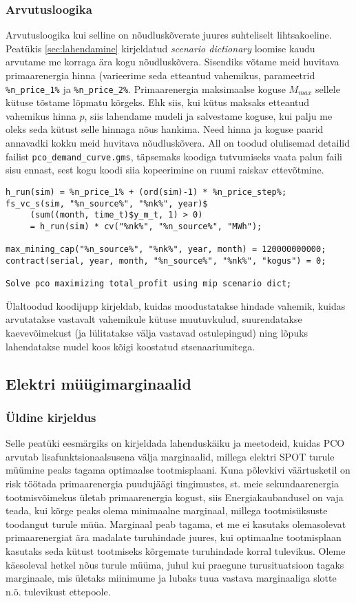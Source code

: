 \documentclass[10pt,a4paper]{article}
\begin{document}
\subsubsection{Arvutusloogika}
Arvutusloogika kui selline on nõudluskõverate juures suhteliselt lihtsakoeline. Peatükis \ref{sec:lahendamine} kirjeldatud \emph{scenario dictionary} loomise kaudu arvutame me korraga ära kogu nõudluskõvera. Sisendiks võtame meid huvitava primaarenergia hinna (varieerime seda etteantud vahemikus, parameetrid \texttt{\%n\_price\_1\%} ja \texttt{\%n\_price\_2\%}. Primaarenergia maksimaalse koguse $\mathit{M}_{max}$ sellele kütuse tõstame lõpmatu kõrgeks. Ehk siis, kui kütus maksaks etteantud vahemikus hinna $p$, siis lahendame mudeli ja salvestame koguse, kui palju me oleks seda kütust selle hinnaga nõus hankima. Need hinna ja koguse paarid annavadki kokku meid huvitava nõudluskõvera. All on toodud olulisemad detailid failist \texttt{pco\_demand\_curve.gms}, täpsemaks koodiga tutvumiseks vaata palun faili sisu ennast, sest kogu koodi siia kopeerimine on ruumi raiskav ettevõtmine. 
\begin{verbatim}
h_run(sim) = %n_price_1% + (ord(sim)-1) * %n_price_step%;  
fs_vc_s(sim, "%n_source%", "%nk%", year)$
     (sum((month, time_t)$y_m_t, 1) > 0) 
     = h_run(sim) * cv("%nk%", "%n_source%", "MWh");   

max_mining_cap("%n_source%", "%nk%", year, month) = 120000000000;
contract(serial, year, month, "%n_source%", "%nk%", "kogus") = 0;

Solve pco maximizing total_profit using mip scenario dict;   
\end{verbatim}

Ülaltoodud koodijupp kirjeldab, kuidas moodustatakse hindade vahemik, kuidas arvutatakse vastavalt vahemikule kütuse muutuvkulud, suurendatakse kaevevõimekust (ja lülitatakse välja vastavad ostulepingud) ning lõpuks lahendatakse mudel koos kõigi koostatud stsenaariumitega.

\subsection{Elektri müügimarginaalid}
\subsubsection{Üldine kirjeldus}
Selle peatüki eesmärgiks on kirjeldada lahenduskäiku ja meetodeid, kuidas PCO arvutab lisafunktsionaalsusena välja marginaalid, millega elektri SPOT turule müümine peaks tagama optimaalse tootmisplaani. Kuna põlevkivi väärtusketil on risk töötada primaarenergia puudujäägi tingimustes, st. meie sekundaarenergia tootmisvõimekus ületab primaarenergia kogust, siis Energiakaubandusel on vaja teada, kui kõrge peaks olema minimaalne marginaal, millega tootmisüksuste toodangut turule müüa. Marginaal peab tagama, et me ei kasutaks olemasolevat primaarenergiat ära madalate turuhindade juures, kui optimaalne tootmisplaan kasutaks seda kütust tootmiseks kõrgemate turuhindade korral tulevikus. Oleme käesoleval hetkel nõus turule müüma, juhul kui praegune turusituatsioon tagaks marginaale, mis ületaks miinimume ja lubaks tuua vastava marginaaliga slotte n.ö. tulevikust ettepoole. 
\end{document}
